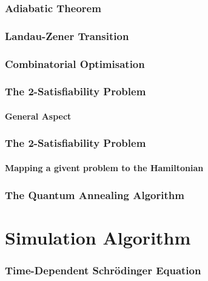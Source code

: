 \documentclass{beamer}
\begin{document}
\begin{frame}
	\frametitle{Adiabatic Theorem}
\end{frame}

\begin{frame}
	\frametitle{Landau-Zener Transition}
\end{frame}

\begin{frame}
	\frametitle{Combinatorial Optimisation}
\end{frame}

\begin{frame}
	\frametitle{The 2-Satisfiability Problem}
	\framesubtitle{General Aspect}
\end{frame}

\begin{frame}
	\frametitle{The 2-Satisfiability Problem}
	\framesubtitle{Mapping a givent problem to the Hamiltonian}
\end{frame}

\begin{frame}
	\frametitle{The Quantum Annealing Algorithm}
\end{frame}


\section{Simulation Algorithm}

\begin{frame}
	\frametitle{Time-Dependent Schrödinger Equation}
\end{frame}
\end{document}
